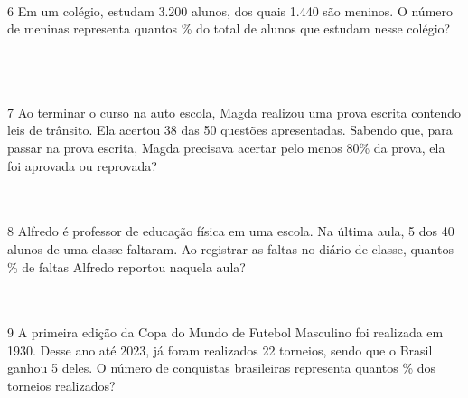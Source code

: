 \\

\\

\\

\num{6} Em um colégio, estudam 3.200 alunos, dos quais 1.440 são meninos. O
número de meninas representa quantos \% do total de alunos que estudam
nesse colégio?


\\

\\

\\

\num{7} Ao terminar o curso na auto escola, Magda realizou uma prova escrita
contendo leis de trânsito. Ela acertou 38 das 50 questões apresentadas.
Sabendo que, para passar na prova escrita, Magda precisava acertar pelo
menos 80\% da prova, ela foi aprovada ou reprovada?


\\

\\

\num{8} Alfredo é professor de educação física em uma escola. Na última aula,
5 dos 40 alunos de uma classe faltaram. Ao registrar as faltas no diário
de classe, quantos \% de faltas Alfredo reportou naquela aula?


\\

\\

\num{9} A primeira edição da Copa do Mundo de Futebol Masculino foi realizada
em 1930. Desse ano até 2023, já foram realizados 22 torneios, sendo que
o Brasil ganhou 5 deles. O número de conquistas brasileiras representa
quantos \% dos torneios realizados?


